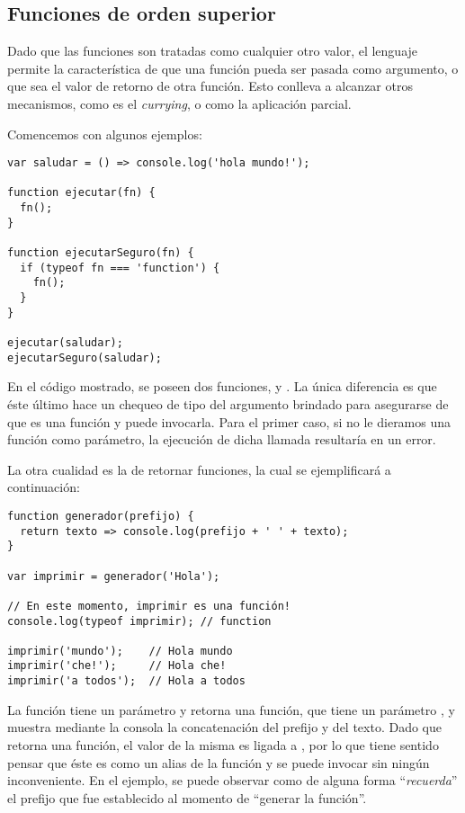 \subsection{Funciones de orden superior}

Dado que las funciones son tratadas como cualquier otro valor, el lenguaje permite la característica de que una función pueda ser pasada como argumento, o que sea el valor de retorno de otra función. Esto conlleva a alcanzar otros mecanismos, como es el \textit{currying}, o como la aplicación parcial.

Comencemos con algunos ejemplos:

\begin{lstlisting}[title={Pasando una función como argumento}]
var saludar = () => console.log('hola mundo!');

function ejecutar(fn) {
  fn();
}

function ejecutarSeguro(fn) {
  if (typeof fn === 'function') {
    fn();
  }
}

ejecutar(saludar);
ejecutarSeguro(saludar);
\end{lstlisting}

En el código mostrado, se poseen dos funciones,  y . La única diferencia es que éste último hace un chequeo de tipo del argumento brindado para asegurarse de que es una función y puede invocarla. Para el primer caso, si no le dieramos una función como parámetro, la ejecución de dicha llamada resultaría en un error.

La otra cualidad es la de retornar funciones, la cual se ejemplificará a continuación:

\begin{lstlisting}[title={Retornando funciones}]
function generador(prefijo) {
  return texto => console.log(prefijo + ' ' + texto);
}

var imprimir = generador('Hola');

// En este momento, imprimir es una función!
console.log(typeof imprimir); // function

imprimir('mundo');    // Hola mundo
imprimir('che!');     // Hola che!
imprimir('a todos');  // Hola a todos
\end{lstlisting}

La función  tiene un parámetro  y retorna una función, que tiene un parámetro , y muestra mediante la consola la concatenación del prefijo y del texto. Dado que  retorna una función, el valor de la misma es ligada a , por lo que tiene sentido pensar que éste es como un alias de la función y se puede invocar sin ningún inconveniente. En el ejemplo, se puede observar como  de alguna forma "`\textit{recuerda}"' el prefijo que fue establecido al momento de "`generar la función"'.

